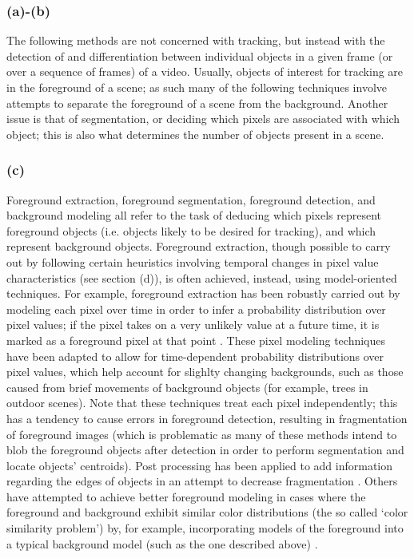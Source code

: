 \documentclass{article}
\begin{document}
\subsubsection*{(a)-(b)}
The following methods are not concerned with tracking, but instead with the detection of and differentiation between individual objects in a given frame (or over a sequence of frames) of a video. Usually, objects of interest for tracking are in the foreground of a scene; as such many of the following techniques involve attempts to separate the foreground of a scene from the background. Another issue is that of segmentation, or deciding which pixels are associated with which object; this is also what determines the number of objects present in a scene. 

\subsubsection*{(c)}
Foreground extraction, foreground segmentation, foreground detection, and background modeling all refer to the task of deducing which pixels represent foreground objects (i.e. objects likely to be desired for tracking), and which represent background objects. Foreground extraction, though possible to carry out by following certain heuristics involving temporal changes in pixel value characteristics (see section (d)), is often achieved, instead, using model-oriented techniques. For example, foreground extraction has been robustly carried out by modeling each pixel over time in order to infer a probability distribution over pixel values; if the pixel takes on a very unlikely value at a future time, it is marked as a foreground pixel at that point \citep{stauffer_1999, elgammal_2000, elgammal_2002}. These pixel modeling techniques have been adapted to allow for time-dependent probability distributions over pixel values, which help account for slighlty changing backgrounds, such as those caused from brief movements of background objects (for example, trees in outdoor scenes). Note that these techniques treat each pixel independently; this has a tendency to cause errors in foreground detection, resulting in fragmentation of foreground images (which is problematic as many of these methods intend to blob the foreground objects after detection in order to perform segmentation and locate objects' centroids). Post processing has been applied to add information regarding the edges of objects in an attempt to decrease fragmentation \citep{turdu_2007}. Others have attempted to achieve better foreground modeling in cases where the foreground and background exhibit similar color distributions (the so called `color similarity problem') by, for example, incorporating models of the foreground into a typical background model (such as the one described above) \citep{gallego_2009, mchugh_2009}.
\end{document}
